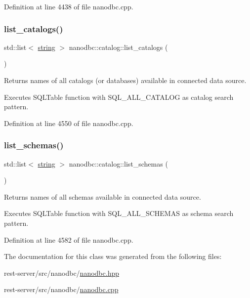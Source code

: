 Definition at line 4438 of file nanodbc.\+cpp.

\mbox{\label{classnanodbc_1_1catalog_a47339f7d553a97b737f6529b53ee2b3d}} 
\subsubsection{\texorpdfstring{list\_catalogs()}{list\_catalogs()}}
{\footnotesize\ttfamily std\+::list$<$ \mbox{\hyperlink{namespacenanodbc_abfc0ece56278e590911ec8352774c212}{string}} $>$ nanodbc\+::catalog\+::list\+\_\+catalogs (\begin{DoxyParamCaption}{ }\end{DoxyParamCaption})}



Returns names of all catalogs (or databases) available in connected data source. 

Executes {\ttfamily S\+Q\+L\+Table} function with {\ttfamily S\+Q\+L\+\_\+\+A\+L\+L\+\_\+\+C\+A\+T\+A\+L\+OG} as catalog search pattern. 

Definition at line 4550 of file nanodbc.\+cpp.

\mbox{\label{classnanodbc_1_1catalog_a00ec6b6cab5f6dab26dcd3b9d3435351}} 
\subsubsection{\texorpdfstring{list\_schemas()}{list\_schemas()}}
{\footnotesize\ttfamily std\+::list$<$ \mbox{\hyperlink{namespacenanodbc_abfc0ece56278e590911ec8352774c212}{string}} $>$ nanodbc\+::catalog\+::list\+\_\+schemas (\begin{DoxyParamCaption}{ }\end{DoxyParamCaption})}



Returns names of all schemas available in connected data source. 

Executes {\ttfamily S\+Q\+L\+Table} function with {\ttfamily S\+Q\+L\+\_\+\+A\+L\+L\+\_\+\+S\+C\+H\+E\+M\+AS} as schema search pattern. 

Definition at line 4582 of file nanodbc.\+cpp.



The documentation for this class was generated from the following files\+:\begin{DoxyCompactItemize}
\item 
rest-\/server/src/nanodbc/\mbox{\hyperlink{nanodbc_8hpp}{nanodbc.\+hpp}}\item 
rest-\/server/src/nanodbc/\mbox{\hyperlink{nanodbc_8cpp}{nanodbc.\+cpp}}\end{DoxyCompactItemize}

